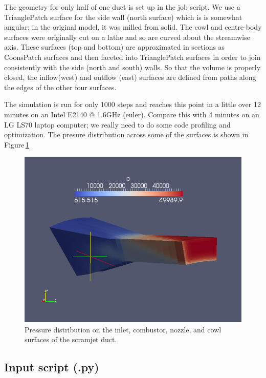 \medskip
The geometry for only half of one duct is set up in the job script.
We use a TrianglePatch surface for the side wall (north surface) which is is
somewhat angular; in the original model, it was milled from solid.
The cowl and centre-body surfaces were originally cut on a lathe and so are
curved about the streamwise axis.
These surfaces (top and bottom) are approximated in sections as 
CoonsPatch surfaces and then faceted into TrianglePatch surfaces in order to
join consistently with the side (north and south) walls.
So that the volume is properly closed, the inflow(west) and outflow (east)
surfaces are defined from paths along the edges of the other four surfaces.

\medskip
The simulation is run for only 1000 steps and reaches this point in
a little over 12 minutes on an Intel E2140 @ 1.6GHz (euler).
Compare this with 4 minutes on an LG LS70 laptop computer; we really need to do some
code profiling and optimization.
The presure distribution across some of the surfaces is shown in Figure\,\ref{scram1-p-fig}

\begin{figure}[htbp]
\begin{center}
\includegraphics[width=12cm]{../3D/scramjet-1/scram1-p-field.png}
\end{center}
\caption{Pressure distribution on the inlet, combustor, nozzle, and cowl 
  surfaces of the scramjet duct.}
\label{scram1-p-fig}
\end{figure}

\newpage
\subsection{Input script (.py)}
\topbar

\bottombar
